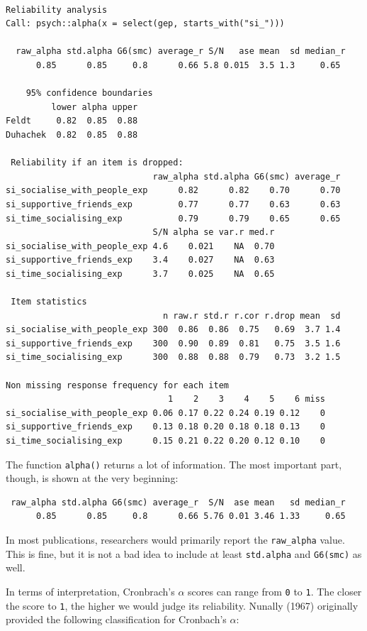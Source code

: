 \documentclass[
  letterpaper,
  DIV=11,
  numbers=noendperiod]{scrreprt}
\begin{document}
\begin{verbatim}

Reliability analysis   
Call: psych::alpha(x = select(gep, starts_with("si_")))

  raw_alpha std.alpha G6(smc) average_r S/N   ase mean  sd median_r
      0.85      0.85     0.8      0.66 5.8 0.015  3.5 1.3     0.65

    95% confidence boundaries 
         lower alpha upper
Feldt     0.82  0.85  0.88
Duhachek  0.82  0.85  0.88

 Reliability if an item is dropped:
                             raw_alpha std.alpha G6(smc) average_r
si_socialise_with_people_exp      0.82      0.82    0.70      0.70
si_supportive_friends_exp         0.77      0.77    0.63      0.63
si_time_socialising_exp           0.79      0.79    0.65      0.65
                             S/N alpha se var.r med.r
si_socialise_with_people_exp 4.6    0.021    NA  0.70
si_supportive_friends_exp    3.4    0.027    NA  0.63
si_time_socialising_exp      3.7    0.025    NA  0.65

 Item statistics 
                               n raw.r std.r r.cor r.drop mean  sd
si_socialise_with_people_exp 300  0.86  0.86  0.75   0.69  3.7 1.4
si_supportive_friends_exp    300  0.90  0.89  0.81   0.75  3.5 1.6
si_time_socialising_exp      300  0.88  0.88  0.79   0.73  3.2 1.5

Non missing response frequency for each item
                                1    2    3    4    5    6 miss
si_socialise_with_people_exp 0.06 0.17 0.22 0.24 0.19 0.12    0
si_supportive_friends_exp    0.13 0.18 0.20 0.18 0.18 0.13    0
si_time_socialising_exp      0.15 0.21 0.22 0.20 0.12 0.10    0
\end{verbatim}

The function \texttt{alpha()} returns a lot of information. The most
important part, though, is shown at the very beginning:

\begin{verbatim}
 raw_alpha std.alpha G6(smc) average_r  S/N  ase mean   sd median_r
      0.85      0.85     0.8      0.66 5.76 0.01 3.46 1.33     0.65
\end{verbatim}

In most publications, researchers would primarily report the
\texttt{raw\_alpha} value. This is fine, but it is not a bad idea to
include at least \texttt{std.alpha} and \texttt{G6(smc)} as well.

In terms of interpretation, Cronbrach's \(\alpha\) scores can range from
\texttt{0} to \texttt{1}. The closer the score to \texttt{1}, the higher
we would judge its reliability. Nunally (1967) originally provided the
following classification for Cronbach's \(\alpha\):
\end{document}
